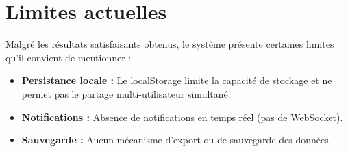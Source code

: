 \documentclass[12pt,a4paper,oneside]{report}
\begin{document}
\section{Limites actuelles}

Malgré les résultats satisfaisants obtenus, le système présente certaines limites qu'il convient de mentionner :

\begin{itemize}
    \item \textbf{Persistance locale :} Le localStorage limite la capacité de stockage et ne permet pas le partage multi-utilisateur simultané.
    \item \textbf{Notifications :} Absence de notifications en temps réel (pas de WebSocket).
    \item \textbf{Sauvegarde :} Aucun mécanisme d'export ou de sauvegarde des données.
\end{itemize}
\end{document}
